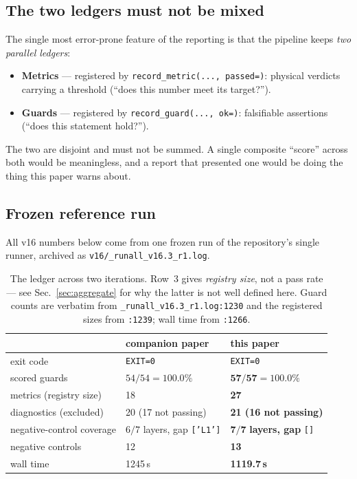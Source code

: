 \documentclass[11pt,a4paper]{article}
\newcommand{\code}[1]{\texttt{\small #1}}
\newcommand{\src}[1]{{\footnotesize\texttt{#1}}}
\begin{document}
\subsection{The two ledgers must not be mixed}

The single most error-prone feature of the reporting is that the pipeline keeps
\emph{two parallel ledgers}:

\begin{itemize}[leftmargin=1.4em,itemsep=2pt]
  \item \textbf{Metrics} --- registered by \code{record_metric(..., passed=)}:
        physical verdicts carrying a threshold (``does this number meet its
        target?'').
  \item \textbf{Guards} --- registered by \code{record_guard(..., ok=)}:
        falsifiable assertions (``does this statement hold?'').
\end{itemize}

The two are disjoint and must not be summed. A single composite ``score'' across
both would be meaningless, and a report that presented one would be doing the
thing this paper warns about.

\subsection{Frozen reference run}

All v16 numbers below come from one frozen run of the repository's single
runner, archived as \src{v16/\_runall\_v16.3\_r1.log}.

\begin{table}[h]
\centering
\small
\begin{tabular}{l l l}
\toprule
 & companion paper & \textbf{this paper} \\
\midrule
exit code                    & \code{EXIT=0}      & \code{EXIT=0} \\
scored guards                & $54/54 = 100.0\%$  & $\mathbf{57/57 = 100.0\%}$ \\
metrics (registry size)      & 18                 & \textbf{27} \\
diagnostics (excluded)       & 20 (17 not passing)& \textbf{21 (16 not passing)} \\
negative-control coverage    & $6/7$ layers, gap \code{['L1']}
                                                    & $\mathbf{7/7}$ \textbf{layers, gap} \code{[]} \\
negative controls            & 12                 & \textbf{13} \\
wall time                    & 1245\,s            & \textbf{1119.7\,s} \\
\bottomrule
\end{tabular}
\caption{The ledger across two iterations. Row~3 gives \emph{registry size}, not
a pass rate --- see Sec.~\ref{sec:aggregate} for why the latter is not well
defined here. Guard counts are verbatim from \src{\_runall\_v16.3\_r1.log:1230}
and the registered sizes from \src{:1239}; wall time from \src{:1266}.}
\label{tab:ledger}
\end{table}
\end{document}
